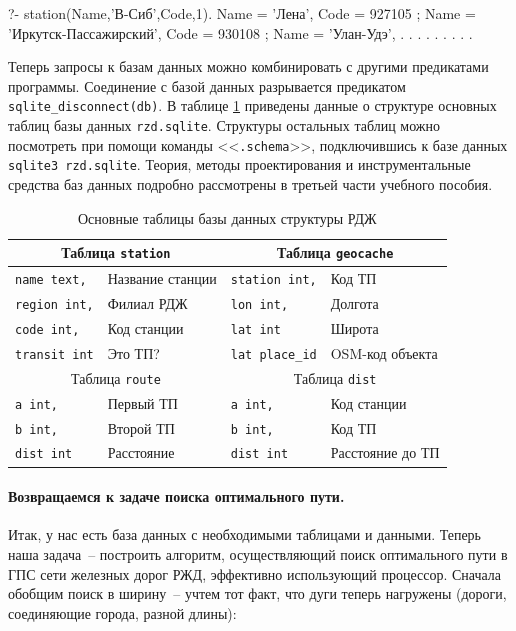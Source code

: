 \documentclass[a4paper,14pt, openany, twoside, final]{extbook} %
\begin{document}
\begin{proexp}
?- station(Name,'В-Сиб',Code,1).
Name = 'Лена',
Code = 927105 ;
Name = 'Иркутск-Пассажирский',
Code = 930108 ;
Name = 'Улан-Удэ',
. . . . . . . . .
\end{proexp}


Теперь запросы к базам данных можно комбинировать с другими предикатами программы.  Соединение с базой данных разрывается предикатом \texttt{sqlite\_disconnect(db)}.  В таблице \ref{tab:dbstruct} приведены данные о структуре основных таблиц базы данных \texttt{rzd.sqlite}.  Структуры остальных таблиц можно посмотреть при помощи команды <<\texttt{.schema}>>, подключившись к базе данных \texttt{sqlite3 rzd.sqlite}.  Теория, методы проектирования и инструментальные средства баз данных подробно рассмотрены в третьей части учебного пособия.
\begin{table}[tbh]
\begin{center}\small
\caption{Основные таблицы базы данных структуры РДЖ} \label{tab:dbstruct}
\begin{tabular}{|l|l||l|l|}
 \hline
\multicolumn{2}{|c||}{Таблица \texttt{station}} & \multicolumn{2}{c|}{Таблица \texttt{geocache}} \\
\hline
\texttt{name text,} & Название станции & \texttt{station int,} & Код ТП \\
\hline
\texttt{region int,} & Филиал РДЖ & \texttt{lon int,} & Долгота \\
\hline
\texttt{code int,} & Код станции & \texttt{lat int} & Широта \\
\hline
\texttt{transit int} & Это ТП? & \texttt{lat place\_id} & OSM-код объекта \\
  \hline
\multicolumn{2}{|c||}{Таблица \texttt{route}} & \multicolumn{2}{c|}{Таблица \texttt{dist}} \\
  \hline
\texttt{a int,} & Первый ТП & \texttt{a int,} & Код станции \\
\hline
\texttt{b int,} & Второй ТП & \texttt{b int,} & Код ТП \\
\hline
\texttt{dist int} & Расстояние & \texttt{dist int} & Расстояние до ТП \\
\hline
\end{tabular}
\end{center}
\end{table}

\paragraph{Возвращаемся к задаче поиска оптимального пути.} \label{par:informedcont} Итак, у нас есть база данных с необходимыми таблицами и данными.  Теперь наша задача~-- построить алгоритм, осуществляющий поиск оптимального пути в ГПС сети железных дорог РЖД, эффективно использующий процессор.  Сначала обобщим поиск в ширину~--  учтем тот факт, что дуги теперь нагружены (дороги, соединяющие города, разной длины):
\end{document}
